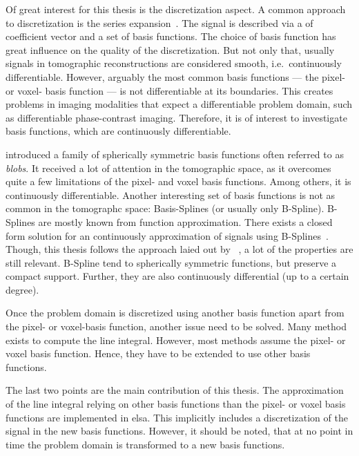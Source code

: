 Of great interest for this thesis is the discretization aspect. A common approach to discretization
is the series expansion~\cite{herman_basis_2015}. The signal is described via a of coefficient
vector and a set of basis functions. The choice of basis function has great influence on the quality
of the discretization. But not only that, usually signals in tomographic reconstructions are
considered smooth, i.e.\ continuously differentiable. However, arguably the most common basis
functions --- the pixel- or voxel- basis function --- is not differentiable at its boundaries. This
creates problems in imaging modalities that expect a differentiable problem domain, such as
differentiable phase-contrast imaging. Therefore, it is of interest to investigate basis functions,
which are continuously differentiable.

\citeauthor*{lewitt_multidimensional_1990} introduced a family of spherically symmetric basis
functions often referred to as \textit{blobs}. It received a lot of attention in the tomographic
space, as it overcomes quite a few limitations of the pixel- and voxel basis functions. Among
others, it is continuously differentiable. Another interesting set of basis functions is not as
common in the tomographc space: Basis-Splines (or usually only B-Spline). B-Splines are mostly known
from function approximation. There exists a closed form solution for an continuously approximation
of signals using B-Splines~\cite{unser_fast_1991}. Though, this thesis follows the approach laied out
by \citeauthor*{momey_new_2011}~\cite{momey_new_2011,momey_b-spline_2012, momey_spline_2015}, a lot
of the properties are still relevant. B-Spline tend to spherically symmetric functions, but preserve
a compact support. Further, they are also continuously differential (up to a certain degree).

Once the problem domain is discretized using another basis function apart from the pixel- or
voxel-basis function, another issue need to be solved. Many method exists to compute the line
integral. However, most methods assume the pixel- or voxel basis function. Hence, they have to be
extended to use other basis functions.

The last two points are the main contribution of this thesis. The approximation of the line integral
relying on other basis functions than the pixel- or voxel basis functions are implemented in elsa.
This implicitly includes a discretization of the signal in the new basis functions. However, it
should be noted, that at no point in time the problem domain is transformed to a new basis
functions.

